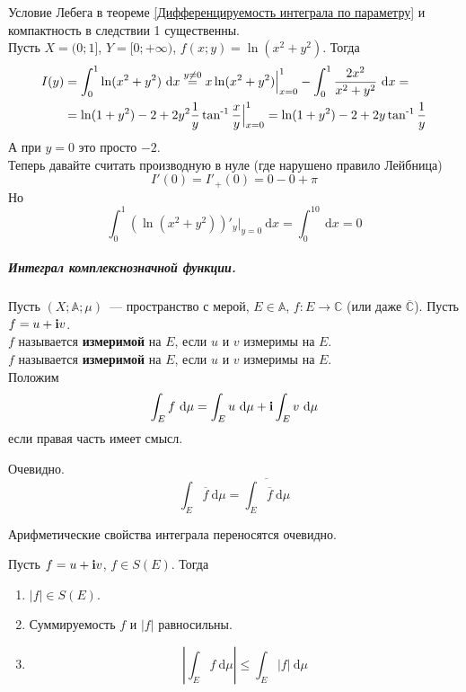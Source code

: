 \documentclass{article}
\begin{document}
    \begin{example}
        Условие Лебега в теореме \ref{Дифференцируемость интеграла по параметру} и компактность в следствии 1 существенны.\\
        Пусть $X=(0;1]$, $Y=[0;+\infty)$, $f(x;y)=\ln(x^2+y^2)$. Тогда
        \[\begin{split}
            I(y)&=\int_0^1\ln(x^2+y^2)~\mathrm dx\overset{y\neq0}=x\ln(x^2+y^2)\Big|_{x=0}^1-\int_0^1\frac{2x^2}{x^2+y^2}~\mathrm dx=\\
            &=\ln(1+y^2)-2+2y^2\frac1y\operatorname{\tan^{-1}}\frac xy\Big|_{x=0}^1=\ln(1+y^2)-2+2y\operatorname{\tan^{-1}}\frac1y
        \end{split}\]
        А при $y=0$ это просто $-2$.\\
        Теперь давайте считать производную в нуле (где нарушено правило Лейбница)
        $$
        I'(0)=I'_+(0)=0-0+\pi
        $$
        Но
        $$
        \int_0^1\left(\ln(x^2+y^2)\right)'_y\bigg|_{y=0}~\mathrm dx=\int_0^10~\mathrm dx=0
        $$
    \end{example}
    \subparagraph{Интеграл комплекснозначной функции.}
    \begin{definition}
        Пусть $(X;\mathbb A;\mu)$~--- пространство с мерой, $E\in\mathbb A$, $f\colon E\to\mathbb C$ (или даже $\overline{\mathbb C}$). Пусть $f=u+{\mathbf i} v$.\\
        $f$ называется \textbf{измеримой} на $E$, если $u$ и $v$ измеримы на $E$.\\
        $f$ называется \textbf{измеримой} на $E$, если $u$ и $v$ измеримы на $E$.\\
        Положим
        $$
        \int_Ef~\mathrm d\mu=\int_Eu~\mathrm d\mu+{\mathbf i}\int_Ev~\mathrm d\mu
        $$
        если правая часть имеет смысл.
    \end{definition}
    \begin{property}
        Очевидно.
        $$
        \int_E\overline f~\mathrm d\mu=\overline{\int_E\overline f~\mathrm d\mu}
        $$
    \end{property}
    \begin{property}
        Арифметические свойства интеграла переносятся очевидно.
    \end{property}
    \begin{lemma}
        Пусть $f=u+{\mathbf i} v$, $f\in S(E)$. Тогда
        \begin{enumerate}
            \item $|f|\in S(E)$.
            \item Суммируемость $f$ и $|f|$ равносильны.
            \item
            $$
            \left|\int_Ef~\mathrm d\mu\right|\leqslant\int_E|f|~\mathrm d\mu
            $$
        \end{enumerate}
    \end{lemma}
\end{document}
